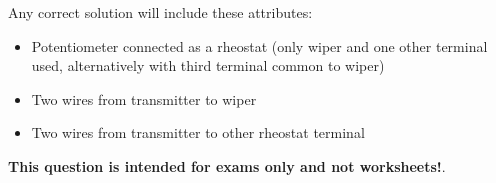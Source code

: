 Any correct solution will include these attributes:

\begin{itemize}
\item{} Potentiometer connected as a rheostat (only wiper and one other terminal used, alternatively with third terminal common to wiper)
\item{} Two wires from transmitter to wiper
\item{} Two wires from transmitter to other rheostat terminal
\end{itemize}







{\bf This question is intended for exams only and not worksheets!}.



